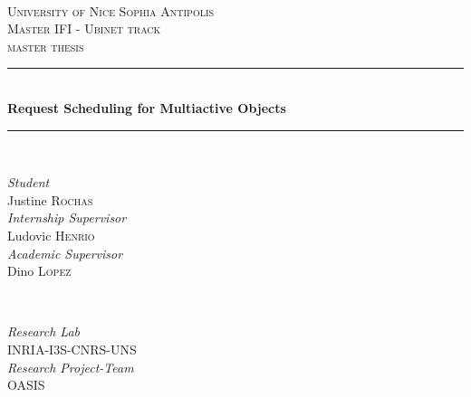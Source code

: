 \documentclass[11pt]{report}
\begin{document}
\onehalfspacing
\begin{titlepage}

\newcommand{\HRule}{\rule{\linewidth}{0.5mm}} %

\center %
 
\textbf{}\\[0.5cm]
\textsc{\LARGE University of Nice Sophia Antipolis}\\[1cm] %
\textsc{\Large Master IFI - Ubinet track}\\[0.5cm] %
\textsc{\large master thesis}\\[0.5cm] %


\HRule \\[0.4cm]
{ \huge \bfseries Request Scheduling for Multiactive Objects}\\[0.4cm] %
\HRule \\[1cm]
 
\begin{minipage}{0.48\textwidth}
\center
\Large \emph{Student}\\
Justine \textsc{Rochas}\\[0.5cm]%
\emph{Internship Supervisor} \\
Ludovic \textsc{Henrio}\\[0.5cm]%
\emph{Academic Supervisor} \\
Dino \textsc{Lopez}\\[0.5cm]%
\end{minipage}
~
\begin{minipage}{0.48\textwidth}
\center
\Large \emph{Research Lab}\\
\textsc{INRIA-I3S-CNRS-UNS} \\[0.5cm]%
\emph{Research Project-Team}\\
\textsc{OASIS}\\[0.5cm] %
\end{minipage}\\[4cm]


\end{titlepage}
\end{document}
